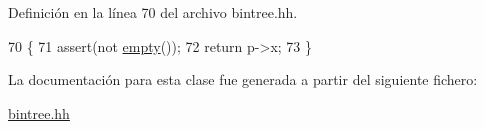 Definición en la línea 70 del archivo bintree.\+hh.


\begin{DoxyCode}
70                             \{
71         assert(not \hyperlink{class_bin_tree_a74cda259ba5c25b8ee38ed4dc33e4fad}{empty}());
72         \textcolor{keywordflow}{return} p->x;
73     \}
\end{DoxyCode}


La documentación para esta clase fue generada a partir del siguiente fichero\+:\begin{DoxyCompactItemize}
\item 
\hyperlink{bintree_8hh}{bintree.\+hh}\end{DoxyCompactItemize}
